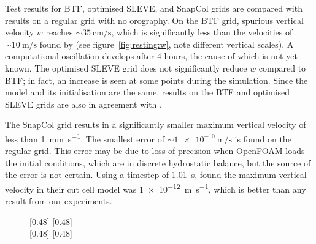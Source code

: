 Test results for BTF, optimised SLEVE, and SnapCol grids are compared with results on a regular grid with no orography.  On the BTF grid, spurious vertical velocity $w$ reaches $\sim \SI{35}{\centi\meter\per\second}$, which is significantly less than the velocities of $\sim \SI{10}{\meter\per\second}$ found by \textcite{klemp2011} (see figure~\ref{fig:resting:w}, note different vertical scales).  A computational oscillation develops after 4 hours, the cause of which is not yet known.  The optimised SLEVE grid does not significantly reduce $w$ compared to BTF; in fact, an increase is seen at some points during the simulation.  Since the model and its initialisation are the same, results on the BTF and optimised SLEVE grids are also in agreement with \textcite{weller-shahrokhi2014}.

The SnapCol grid results in a significantly smaller maximum vertical velocity of less than \SI{1}{\milli\meter\per\second}.  The smallest error of $\sim \SI{1e-10}{\meter\per\second}$ is found on the regular grid.  This error may be due to loss of precision when OpenFOAM loads the initial conditions, which are in discrete hydrostatic balance, but the source of the error is not certain.  Using a timestep of \SI{1.01}{\second}, \textcite{good2013} found the maximum vertical velocity in their cut cell model was \SI{1e-12}{\meter\per\second}, which is better than any result from our experiments.

\begin{figure}
	\captionsetup[subfigure]{position=b}
	\centering
	[0.48\textwidth]{}
	\hfill
	[0.48\textwidth]{}
	\\
	[0.48\textwidth]{}
	\hfill
	[0.48\textwidth]{}
	\caption{}
	\label{fig:resting:energy}
\end{figure}





